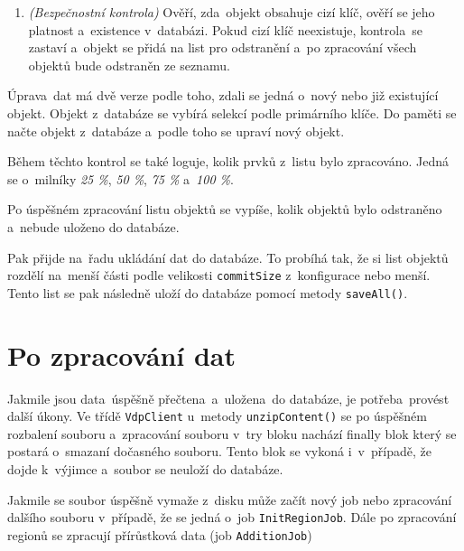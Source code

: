 \begin{enumerate}
    \item \textit{(Bezpečnostní kontrola)} Ověří, zda~objekt obsahuje cizí klíč, ověří se jeho platnost a~existence v~databázi.
    Pokud cizí klíč neexistuje, kontrola~se zastaví a~objekt se přidá na list pro odstranění a~po zpracování všech objektů
    bude odstraněn ze seznamu.
\end{enumerate}

Úprava~dat má dvě verze podle toho, zdali se jedná o~nový nebo již existující objekt.
Objekt z~databáze se vybírá selekcí podle primárního klíče.
Do paměti se načte objekt z~databáze a~podle toho se upraví nový objekt.

Během těchto kontrol se také loguje, kolik prvků z~listu bylo zpracováno.
Jedná se o~milníky \textit{25 \%}, \textit{50 \%}, \textit{75 \%} a~\textit{100 \%}.

Po úspěšném zpracování listu objektů se vypíše, kolik objektů bylo odstraněno a~nebude uloženo do databáze.

Pak přijde na~řadu ukládání dat do databáze.
To probíhá tak, že si list objektů rozdělí na~menší části podle velikosti \texttt{commitSize} z~konfigurace nebo menší.
Tento list se pak následně uloží do databáze pomocí metody \texttt{saveAll()}.

\section{Po zpracování dat}
Jakmile jsou data~úspěšně přečtena~a~uložena~do databáze, je potřeba~provést další úkony.
Ve třídě \texttt{VdpClient} u~metody \texttt{unzipContent()} se po úspěšném rozbalení souboru
a~zpracování souboru v~try bloku nachází finally blok který se postará o~smazaní dočasného souboru.
Tento blok se vykoná i~v~případě, že dojde k~výjimce a~soubor se neuloží do databáze.

Jakmile se soubor úspěšně vymaže z~disku může začít nový job nebo zpracování dalšího souboru
v~případě, že se jedná o~job \texttt{InitRegionJob}. 
Dále po zpracování regionů se zpracují přírůstková data (job \texttt{AdditionJob})